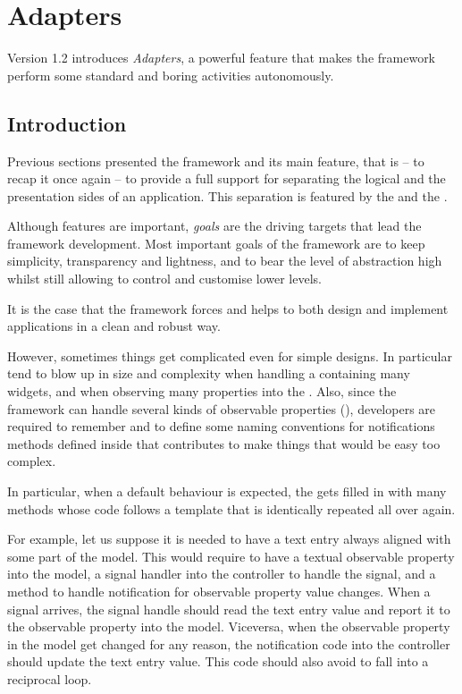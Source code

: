 \section {Adapters}
\label{ADAPT}

Version 1.2 introduces \emph{Adapters}, a powerful feature that
makes the framework perform some standard and boring activities
autonomously.

\subsection{Introduction}

Previous sections presented the framework and its main feature, that
is -- to recap it once again -- to provide a full support for
separating the logical and the presentation sides of an
application. This separation is featured by the \mvc and the \obs.

Although features are important, \emph{goals} are the driving
targets that lead the framework development. Most important goals of
the framework are to keep simplicity, transparency and lightness,
and to bear the level of abstraction high whilst still allowing to
control and customise lower levels.

It is the case that the framework forces and helps to both design
and implement applications in a clean and robust way. 

However, sometimes things get complicated even for simple
designs. In particular  tend to blow up in size and
complexity when handling a  containing many widgets, and
when observing many properties into the . Also, since the
framework can handle several kinds of observable properties (\OPS),
developers are required to remember and to define some naming
conventions for notifications methods defined inside 
that contributes to make things that would be easy too complex.

In particular, when a default behaviour is expected, the
 gets filled in with many methods whose code follows
a template that is identically repeated all over again. 

\bigskip 

For example, let us suppose it is needed to have a text entry always
aligned with some part of the model. This would require to have a
textual observable property into the model, a signal handler into
the controller to handle the  signal, and a
method to handle notification for observable property value
changes. When a  signal arrives, the signal
handle should read the text entry value and report it to the
observable property into the model. Viceversa, when the observable
property in the model get changed for any reason, the notification
code into the controller should update the text entry value. This 
code should also avoid to fall into a reciprocal loop. 

